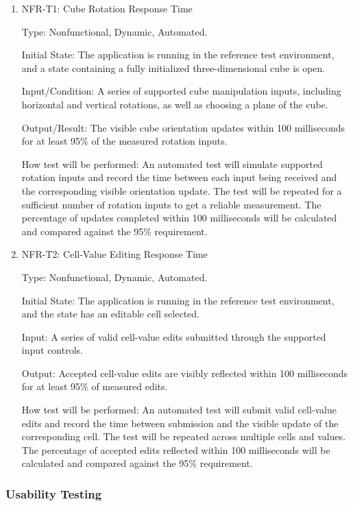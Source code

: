 \documentclass[12pt, titlepage]{article}
\begin{document}
\begin{enumerate}

\item{NFR-T1: Cube Rotation Response Time\\}

Type: Nonfunctional, Dynamic, Automated.

Initial State: The application is running in the reference test
environment, and a state containing a fully initialized three-dimensional
cube is open.

Input/Condition: A series of supported cube manipulation inputs, including
horizontal and vertical rotations, as well as choosing a plane of the cube.

Output/Result: The visible cube orientation updates within 100
milliseconds for at least 95\% of the measured rotation inputs.

How test will be performed: An automated test will simulate supported
rotation inputs and record the time between each input being received
and the corresponding visible orientation update. The test will be
repeated for a sufficient number of rotation inputs to get a reliable
measurement. The percentage of updates completed within 100 milliseconds
will be calculated and compared against the 95\% requirement.

\item{NFR-T2: Cell-Value Editing Response Time\\}

Type: Nonfunctional, Dynamic, Automated.

Initial State: The application is running in the reference test
environment, and the state has an editable cell selected.

Input: A series of valid cell-value edits submitted through the supported
input controls.

Output: Accepted cell-value edits are visibly reflected within 100
milliseconds for at least 95\% of measured edits.

How test will be performed: An automated test will submit valid
cell-value edits and record the time between submission and the visible
update of the corresponding cell. The test will be repeated across
multiple cells and values. The percentage of accepted edits reflected
within 100 milliseconds will be calculated and compared against the
95\% requirement.

\end{enumerate}


\subsubsection{Usability Testing}
\end{document}
